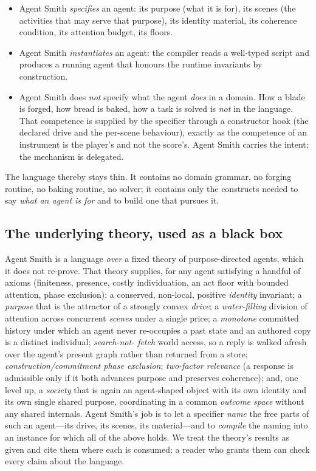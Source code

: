 \documentclass[11pt,twocolumn,a4paper]{article}
\begin{document}
\begin{itemize}[leftmargin=*]
\item Agent Smith \emph{specifies} an agent: its purpose (what it is for),
its scenes (the activities that may serve that purpose), its identity
material, its coherence condition, its attention budget, its floors.
\item Agent Smith \emph{instantiates} an agent: the compiler reads a
well-typed script and produces a running agent that honours the runtime
invariants by construction.
\item Agent Smith does \emph{not} specify what the agent \emph{does} in a
domain. How a blade is forged, how bread is baked, how a task is solved is
\emph{not} in the language. That competence is supplied by the specifier
through a constructor hook (the declared drive and the per-scene behaviour),
exactly as the competence of an instrument is the player's and not the
score's. Agent Smith carries the intent; the mechanism is delegated.
\end{itemize}

The language thereby stays thin. It contains no domain grammar, no forging
routine, no baking routine, no solver; it contains only the constructs needed
to say \emph{what an agent is for} and to build one that pursues it.

\subsection{The underlying theory, used as a black box}

Agent Smith is a language \emph{over} a fixed theory of purpose-directed
agents, which it does not re-prove. That theory supplies, for any agent
satisfying a handful of axioms (finiteness, presence, costly individuation,
an act floor with bounded attention, phase exclusion): a conserved,
non-local, positive \emph{identity} invariant; a \emph{purpose} that is the
attractor of a strongly convex \emph{drive}; a \emph{water-filling} division
of attention across concurrent \emph{scenes} under a single price; a
\emph{monotone} committed history under which an agent never re-occupies a
past state and an authored copy is a distinct individual; \emph{search-not-%
fetch} world access, so a reply is walked afresh over the agent's present
graph rather than returned from a store; \emph{construction/commitment phase
exclusion}; \emph{two-factor relevance} (a response is admissible only if it
both advances purpose and preserves coherence); and, one level up, a
\emph{society} that is again an agent-shaped object with its own identity and
its own single shared purpose, coordinating in a common \emph{outcome space}
without any shared internals. Agent Smith's job is to let a specifier
\emph{name} the free parts of such an agent---its drive, its scenes, its
material---and to \emph{compile} the naming into an instance for which all of
the above holds. We treat the theory's results as given and cite them where
each is consumed; a reader who grants them can check every claim about the
language.
\end{document}

